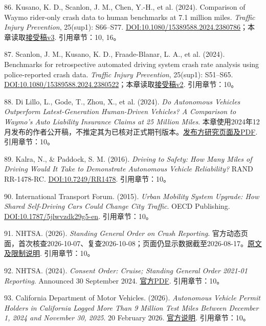 \documentclass[UTF8,fontset=windows,12pt,a4paper,oneside,openany]{ctexbook}
\begin{document}
86. Kusano, K. D., Scanlon, J. M., Chen, Y.-H., et al. (2024). Comparison of Waymo rider-only crash data to human benchmarks at 7.1 million miles. \emph{Traffic Injury Prevention}, 25(sup1): S66–S77. \href{https://doi.org/10.1080/15389588.2024.2380786}{DOI:10.1080/15389588.2024.2380786}；本章读取\href{https://arxiv.org/html/2312.12675v3}{接受稿v3}.
引用章节：10, 16。

87. Scanlon, J. M., Kusano, K. D., Fraade-Blanar, L. A., et al. (2024). Benchmarks for retrospective automated driving system crash rate analysis using police-reported crash data. \emph{Traffic Injury Prevention}, 25(sup1): S51–S65. \href{https://doi.org/10.1080/15389588.2024.2380522}{DOI:10.1080/15389588.2024.2380522}；本章读取\href{https://arxiv.org/html/2312.13228v2}{接受稿v2}.
引用章节：10。

88. Di Lillo, L., Gode, T., Zhou, X., et al. (2024). \emph{Do Autonomous Vehicles Outperform Latest-Generation Human-Driven Vehicles? A Comparison to Waymo's Auto Liability Insurance Claims at 25 Million Miles}. 本章使用2024年12月发布的作者公开稿，不推定其为已核对正式期刊版本。\href{https://waymo.com/research/do-autonomous-vehicles-outperform-latest-generation-human-driven-vehicles-25-million-miles/}{发布方研究页面及PDF}.
引用章节：10。

89. Kalra, N., \& Paddock, S. M. (2016). \emph{Driving to Safety: How Many Miles of Driving Would It Take to Demonstrate Autonomous Vehicle Reliability?} RAND RR-1478-RC. \href{https://doi.org/10.7249/RR1478}{DOI:10.7249/RR1478}.
引用章节：10。

90. International Transport Forum. (2015). \emph{Urban Mobility System Upgrade: How Shared Self-Driving Cars Could Change City Traffic}. OECD Publishing. \href{https://doi.org/10.1787/5jlwvzdk29g5-en}{DOI:10.1787/5jlwvzdk29g5-en}.
引用章节：10。

91. NHTSA. (2026). \emph{Standing General Order on Crash Reporting}. 官方动态页面，首次核查2026-10-07、复查2026-10-08；页面仍显示数据截至2026-08-17。\href{https://www.nhtsa.gov/laws-regulations/standing-general-order-crash-reporting}{原文及限制说明}.
引用章节：10。

92. NHTSA. (2024). \emph{Consent Order: Cruise; Standing General Order 2021-01 Reporting}. Announced 30 September 2024. \href{https://www.nhtsa.gov/sites/nhtsa.gov/files/2024-09/cruise-consent-order-2024-web.pdf}{官方PDF}.
引用章节：10。

93. California Department of Motor Vehicles. (2026). \emph{Autonomous Vehicle Permit Holders in California Logged More Than 9 Million Test Miles Between December 1, 2024 and November 30, 2025}. 20 February 2026. \href{https://www.dmv.ca.gov/portal/news-and-media/autonomous-vehicle-permit-holders-in-california-logged-more-than-9-million-test-miles-between-december-1-2024-and-november-30-2025/}{官方说明}.
引用章节：10。
\end{document}
